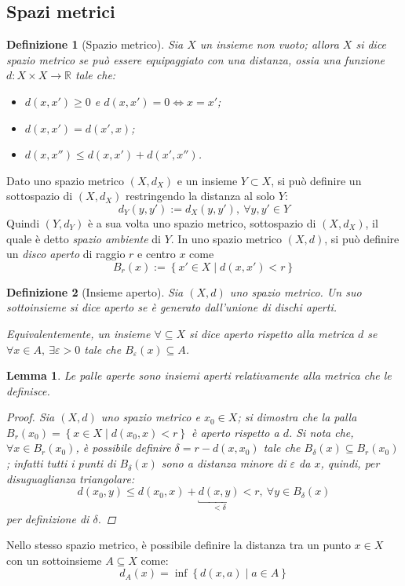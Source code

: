 \documentclass[12pt]{scrartcl}
\theoremstyle{style}
\newtheorem{definizione}{Definizione}[section]
\newtheorem{lemma}{Lemma}[teorema]
\numberwithin{equation}{subsection}
\begin{document}
\subsection{Spazi metrici}
\begin{definizione}
	[Spazio metrico]
Sia $X$ un insieme non vuoto; allora $X$ si dice spazio metrico se pu\`o essere equipaggiato con una \textit{distanza}, ossia una funzione $d : X \times X \to \mathbb{R}$ tale che:
\begin{itemize}
	\item $d(x,x') \ge  0 $ e $d(x,x') = 0 \iff x=x'$;
	\item $d(x,x') = d(x',x)$;
	\item $d(x,x'') \le  d(x,x') + d(x',x'')$.
\end{itemize}
\end{definizione}
\noindent Dato uno spazio metrico $(X,d_X)$ e un insieme $Y \subset  X$, si pu\`o definire un sottospazio di $(X,d_X)$ restringendo la distanza al solo $Y$:
\[
d_Y (y,y') := d_X(y,y'), \ \forall y,y' \in Y
\] 
Quindi $(Y,d_Y)$ \`e a sua volta uno spazio metrico, sottospazio di $(X,d_X)$, il quale \`e detto \textit{spazio ambiente} di $Y$.
In uno spazio metrico $(X,d)$, si pu\`o definire un \textit{disco aperto} di raggio $r$ e centro $x$ come
\[
B_r(x) := \left\{ x' \in X  \mid d(x,x') < r \right\} 
\] 
\begin{definizione}
	[Insieme aperto]
	Sia $(X,d)$ uno spazio metrico. Un suo sottoinsieme si dice aperto se \`e generato dall'unione di dischi aperti.
	
	Equivalentemente, un insieme $\forall \subseteq X$ si dice aperto rispetto alla metrica $d$ se $\forall x \in A, \ \exists \varepsilon >0 $ tale che $B_\varepsilon (x) \subseteq A$.
\end{definizione}
\begin{lemma}
	Le palle aperte sono insiemi aperti relativamente alla metrica che le definisce.
	\begin{proof}
		Sia $(X,d)$ uno spazio metrico e $x_0 \in X$; si dimostra che la palla $B_r(x_0) = \left\{ x \in X  \mid d(x_0,x) < r \right\} $ \`e aperto rispetto a $d$.
		Si nota che, $\forall x \in B_r(x_0)$, \`e possibile definire $\delta = r - d(x,x_0)$ tale che $B_\delta (x) \subseteq B_r(x_0)$; infatti tutti i punti di $B_\delta (x)$ sono a distanza minore di $\varepsilon $ da $x$, quindi, per disuguaglianza triangolare:
		\[
			d(x_0,y) \le d(x_0,x) + \underbracket{d(x,y)}_{< \delta }  < r, \ \forall y \in B_\delta (x)
		\] 
		per definizione di $\delta $.
	\end{proof}
\end{lemma}
\noindent Nello stesso spazio metrico, \`e possibile definire la distanza tra un punto $x \in X$ con un sottoinsieme $A \subseteq X$ come:
\begin{equation}
	d_A(x) = \inf \left\{ d(x,a)  \mid a \in A \right\}   
\end{equation}
\end{document}
